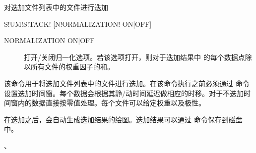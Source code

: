 \label{sss:sumstack}

对迭加文件列表中的文件进行迭加

\begin{SACSTX}
S!UM!S!TACK! [N!ORMALIZATION! ON|OFF]
\end{SACSTX}

\begin{description}
\item [NORMALIZATION ON|OFF] 打开/关闭归一化选项。若该选项打开，则对于迭加结果中
的每个数据点除以所有文件的权重因子的和。
\end{description}

该命令用于将迭加文件列表中的文件进行迭加。在该命令执行之前必须通过  命令设置迭加时间窗。每个数据会根据其静/动时间延迟做相应的时移。对于不迭加时间窗内的数据直接按零值处理。每个文件可以给定权重以及极性。

在迭加之后，会自动生成迭加结果的绘图。迭加结果可以通过  命令保存到磁盘中。

、
